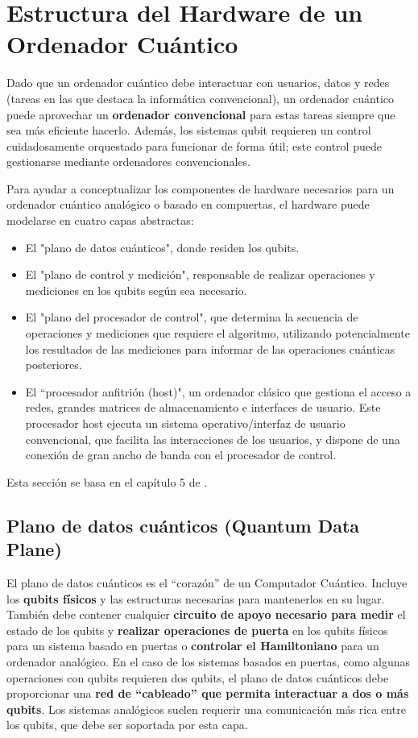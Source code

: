 \section{Estructura del Hardware de un Ordenador Cuántico}

Dado que un ordenador cuántico debe interactuar con usuarios, datos y redes (tareas en las que destaca la informática convencional), un ordenador cuántico puede aprovechar un \textbf{ordenador convencional} para estas tareas siempre que sea más eficiente hacerlo. Además, los sistemas qubit requieren un control cuidadosamente orquestado para funcionar de forma útil; este control puede gestionarse mediante ordenadores convencionales.

Para ayudar a conceptualizar los componentes de hardware necesarios para un ordenador cuántico analógico o basado en compuertas, el hardware puede modelarse en cuatro capas abstractas: 
\begin{itemize}
\item El "plano de datos cuánticos", donde residen los qubits.
\item El "plano de control y medición", responsable de realizar operaciones y mediciones en los qubits según sea necesario.
\item El "plano del procesador de control", que determina la secuencia de operaciones y mediciones que requiere el algoritmo, utilizando potencialmente los resultados de las mediciones para informar de las operaciones cuánticas posteriores.
\item El ``procesador anfitrión (host)", un ordenador clásico que gestiona el acceso a redes, grandes matrices de almacenamiento e interfaces de usuario. Este procesador host ejecuta un sistema operativo/interfaz de usuario convencional, que facilita las interacciones de los usuarios, y dispone de una conexión de gran ancho de banda con el procesador de control.
\end{itemize}

Esta sección se basa en el capítulo 5 de \cite{bib_hardware_intro_progress_and_prospects}.


	\subsection{Plano de datos cuánticos (Quantum Data Plane)}
	
El plano de datos cuánticos es el ``corazón'' de un Computador Cuántico. Incluye los \textbf{qubits físicos} y las estructuras necesarias para mantenerlos en su lugar. También debe contener cualquier \textbf{circuito de apoyo necesario para medir} el estado de los qubits y \textbf{realizar operaciones de puerta} en los qubits físicos para un sistema basado en puertas o \textbf{controlar el Hamiltoniano} para un ordenador analógico.  En el caso de los sistemas basados en puertas, como algunas operaciones con qubits requieren dos qubits, el plano de datos cuánticos debe proporcionar una \textbf{red de ``cableado'' que permita interactuar a dos o más qubits}. Los sistemas analógicos suelen requerir una comunicación más rica entre los qubits, que debe ser soportada por esta capa.



